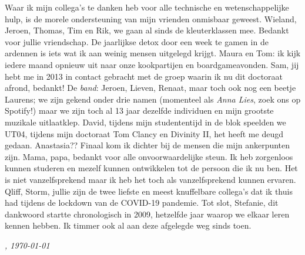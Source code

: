 \documentclass[\home/main.tex]{subfiles}
\begin{document}
Waar ik mijn collega's te danken heb voor alle technische en wetenschappelijke hulp, is de morele ondersteuning van mijn vrienden onmisbaar geweest.
Wieland, Jeroen, Thomas, Tim en Rik, we gaan al sinds de kleuterklassen mee. Bedankt voor jullie vriendschap. De jaarlijkse detox door een week te gamen in de ardennen is iets wat ik aan weinig mensen uitgelegd krijgt.
Maura en Tom: ik kijk iedere maand opnieuw uit naar onze kookpartijen en boardgameavonden.
Sam, jij hebt me in 2013 in contact gebracht met de groep waarin ik nu dit doctoraat afrond, bedankt!
De \textit{band}: Jeroen, Lieven, Renaat, maar toch ook nog een beetje Laurens; we zijn gekend onder drie namen (momenteel als \textit{Anna Lies}, zoek ons op Spotify!) maar we zijn toch al 13 jaar dezelfde individuen en mijn grootste muzikale uitlaatklep.
David, tijdens mijn studententijd in de blok speelden we UT04, tijdens mijn doctoraat Tom Clancy en Divinity II, het heeft me deugd gedaan.
Anastasia??
Finaal kom ik dichter bij de mensen die mijn ankerpunten zijn. Mama, papa, bedankt voor alle onvoorwaardelijke steun. Ik heb zorgenloos kunnen studeren en mezelf kunnen ontwikkelen tot de persoon die ik nu ben. Het is niet vanzelfsprekend maar ik heb het toch als vanzelfsprekend kunnen ervaren.
Qliff, Storm, jullie zijn de twee liefste en meest knuffelbare collega's dat ik thuis had tijdens de lockdown van de COVID-19 pandemie.
Tot slot, Stefanie, dit dankwoord startte chronologisch in 2009, hetzelfde jaar waarop we elkaar leren kennen hebben. Ik timmer ook al aan deze afgelegde weg sinds toen.

\vspace{1cm}

\begin{flushright}
    \textit{\theauthor, \today}
\end{flushright}
\end{document}
